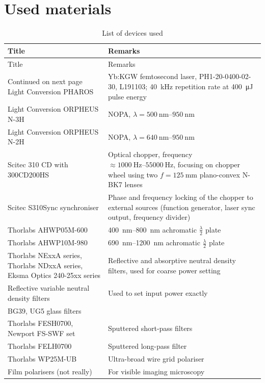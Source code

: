 \documentclass[twoside,openright]{scrreprt}
\begin{document}
\chapter*{Used materials}
\begin{longtable}{p{}p{}}
    \caption{List of devices used}
    \label{tab:devices} \\
    \toprule 
    Title & Remarks \\
    \midrule
    \endfirsthead
    \toprule 
    Title & Remarks \\
    \midrule
    \endhead
    \midrule
    Continued on next page
    \endfoot
    \bottomrule
    \endlastfoot
    Light Conversion PHAROS & Yb:KGW femtosecond laser, PH1-20-0400-02-30, L191103; \SI{40}{\kilo\hertz} repetition rate at \SI{400}{\micro\joule} pulse energy \\
    Light Conversion ORPHEUS N-3H & NOPA, $ \lambda = \SIrange{500}{950}{\nano\meter} $ \\
    Light Conversion ORPHEUS N-2H & NOPA, $ \lambda = \SIrange{640}{950}{\nano\meter} $ \\
    Scitec 310 CD with 300CD200HS & Optical chopper, frequency $\approx \SIrange{1000}{55000}{\hertz}$, focusing on chopper wheel using two $f=\SI{125}{\milli\meter}$ plano-convex N-BK7 lenses \\
    Scitec S310Sync synchroniser & Phase and frequency locking of the chopper to external sources (function generator, laser sync output, frequency divider) \\
    Thorlabs AHWP05M-600 & \SIrange{400}{800}{\nano\meter} achromatic $\frac{\lambda}{2}$ plate \\
    Thorlabs AHWP10M-980 & \SIrange{690}{1200}{\nano\meter} achromatic $\frac{\lambda}{2}$ plate \\
    Thorlabs NExxA series, Thorlabs NDxxA series, Eksma Optics 240-25xx series & Reflective and absorptive neutral density filters, used for coarse power setting \\
    Reflective variable neutral density filters & Used to set input power exactly \\
    BG39, UG5 glass filters \\
    Thorlabs FESH0700, Newport FS-SWF set & Sputtered short-pass filters \\
    Thorlabs FELH0700 & Sputtered long-pass filter \\
    Thorlabs WP25M-UB & Ultra-broad wire grid polariser \\
    Film polarisers (not really) & For visible imaging microscopy \\

\end{longtable}
\end{document}
